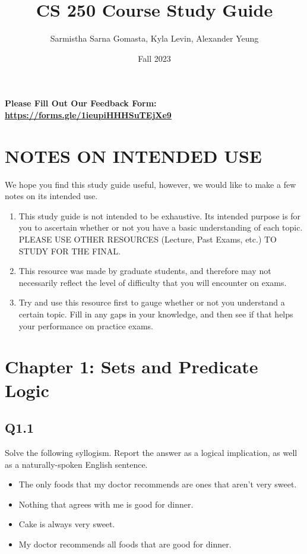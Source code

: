 \documentclass{article}
\title{CS 250 Course Study Guide}
\author{Sarmistha Sarna Gomasta, Kyla Levin, Alexander Yeung}
\date{Fall 2023}
\begin{document}
\maketitle
\begin{center}
    \textbf{Please Fill Out Our Feedback Form: \href{https://forms.gle/1ieupiHHHSuTEjXe9}{https://forms.gle/1ieupiHHHSuTEjXe9}}
\end{center}

\section*{NOTES ON INTENDED USE}
We hope you find this study guide useful, however, we would like to make a few notes on its intended use. 
\begin{center}
    \begin{enumerate}
        \item This study guide is not intended to be exhaustive. Its intended purpose is for you to ascertain whether or not you have a basic understanding of each topic. PLEASE USE OTHER RESOURCES (Lecture, Past Exams, etc.) TO STUDY FOR THE FINAL.
        \item This resource was made by graduate students, and therefore may not necessarily reflect the level of difficulty that you will encounter on exams.
        \item Try and use this resource first to gauge whether or not you understand a certain topic. Fill in any gaps in your knowledge, and then see if that helps your performance on practice exams.  
    \end{enumerate}
    
\end{center}
\section*{Chapter 1: Sets and Predicate Logic}
\subsection*{Q1.1}
Solve the following syllogism. Report the answer as a logical implication, as well as a naturally-spoken English sentence.
\begin{itemize}
    \item The only foods that my doctor recommends are ones that aren't very sweet.
    \item Nothing that agrees with me is good for dinner.
    \item Cake is always very sweet.
    \item My doctor recommends all foods that are good for dinner.
\end{itemize}
\newpage
\end{document}

